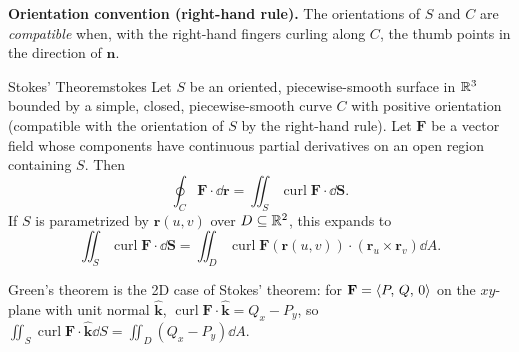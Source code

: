 \textbf{Orientation convention (right-hand rule).} The orientations of $S$ and $C$
are \emph{compatible} when, with the right-hand fingers curling along $C$, the thumb
points in the direction of $\mathbf{n}$.

\begin{center}
\end{center}

\begin{theorem}{Stokes' Theorem}{stokes}
  Let $S$ be an oriented, piecewise-smooth surface in $\mathbb{R}^3$ bounded by a simple,
  closed, piecewise-smooth curve $C$ with positive orientation (compatible with
  the orientation of $S$ by the right-hand rule). Let $\mathbf{F}$ be a vector
  field whose components have continuous partial derivatives on an open region
  containing $S$. Then
  \[
    \oint_C \mathbf{F}\cdot\dd{\mathbf{r}}
    = \iint_S \operatorname{curl}\mathbf{F}\cdot\dd{\mathbf{S}}.
  \]
  If $S$ is parametrized by $\mathbf{r}(u,v)$ over $D\subseteq\mathbb{R}^2$, this expands to
  \[
    \iint_S \operatorname{curl}\mathbf{F}\cdot\dd{\mathbf{S}}
    = \iint_D \operatorname{curl}\mathbf{F}(\mathbf{r}(u,v))\cdot(\mathbf{r}_u\times\mathbf{r}_v)\dd{A}.
  \]
\end{theorem}

\begin{remark}
  Green's theorem is the 2D case of Stokes' theorem: for
  $\mathbf{F}=\langle P,\,Q,\,0 \rangle$ on the $xy$-plane with unit normal $\hat{\mathbf{k}}$,
  $\operatorname{curl}\mathbf{F}\cdot\hat{\mathbf{k}} = Q_x - P_y$, so
  $\iint_S\operatorname{curl}\mathbf{F}\cdot\hat{\mathbf{k}}\dd{S} = \iint_D(Q_x-P_y)\dd{A}$.
\end{remark}

